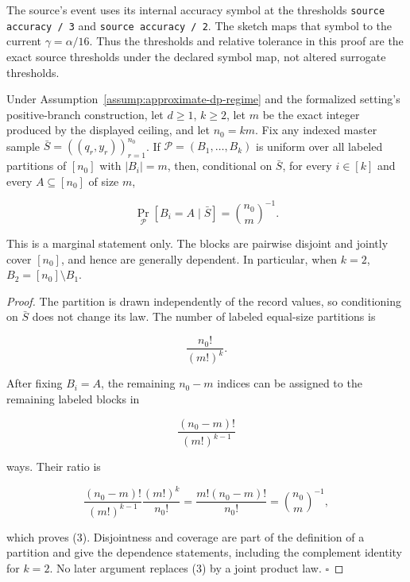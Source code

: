 The source's event uses its internal accuracy symbol at the thresholds
\texttt{source accuracy / 3} and \texttt{source accuracy / 2}.  The  sketch maps
that symbol to the current \(\gamma=\alpha/16\).  Thus the thresholds and
relative tolerance in this proof are the exact source thresholds under the
declared symbol map, not altered surrogate thresholds.



\begin{proposition}\label{prop:step-006-partition}
Under Assumption~\ref{assump:approximate-dp-regime} and the formalized
setting's positive-branch construction, let \(d\geq1\), \(k\geq2\), let
\(m\) be the exact integer produced by the displayed ceiling, and let
\(n_0=km\).  Fix any indexed master sample
\(\bar S=((q_r,y_r))_{r=1}^{n_0}\).  If
\(\mathcal P=(B_1,\ldots,B_k)\) is uniform over all labeled partitions of
\([n_0]\) with \(|B_i|=m\), then, conditional on \(\bar S\), for every
\(i\in[k]\) and every \(A\subseteq[n_0]\) of size \(m\),

\[
 \Pr_{\mathcal P}[B_i=A\mid\bar S]=\binom{n_0}{m}^{-1}.
\tag{3}
\]

This is a marginal statement only.  The blocks are pairwise disjoint and
jointly cover \([n_0]\), and hence are generally dependent.  In particular,
when \(k=2\), \(B_2=[n_0]\setminus B_1\).


\end{proposition}

\begin{proof}
The partition is drawn independently of the record values, so
conditioning on \(\bar S\) does not change its law.  The number of labeled
equal-size partitions is

\[
 \frac{n_0!}{(m!)^k}.
\]

After fixing \(B_i=A\), the remaining \(n_0-m\) indices can be assigned to
the remaining labeled blocks in

\[
 \frac{(n_0-m)!}{(m!)^{k-1}}
\]

ways.  Their ratio is

\[
 \frac{(n_0-m)!}{(m!)^{k-1}}
 \frac{(m!)^k}{n_0!}
 =\frac{m!(n_0-m)!}{n_0!}
 =\binom{n_0}{m}^{-1},
\]

which proves (3).  Disjointness and coverage are part of the definition of
a partition and give the dependence statements, including the complement
identity for \(k=2\).  No later argument replaces (3) by a joint product
law. \(\square\)


\end{proof}

